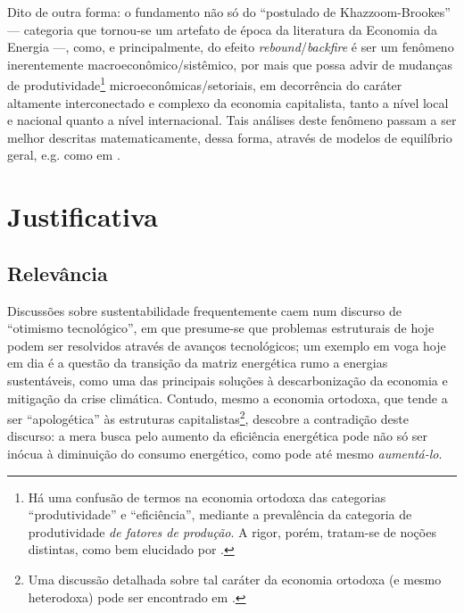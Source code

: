 Dito de outra forma: o fundamento não só do ``postulado de Khazzoom-Brookes'' --- categoria que tornou-se um artefato de época da literatura da Economia da Energia ---, como, e principalmente, do efeito \textit{rebound}/\textit{backfire} é ser um fenômeno inerentemente macroeconômico/sistêmico, por mais que possa advir de mudanças de produtividade\footnote{Há uma confusão de termos na economia ortodoxa das categorias ``produtividade'' e ``eficiência'', mediante a prevalência da categoria de produtividade \textit{de fatores de produção}. A rigor, porém, tratam-se de noções distintas, como bem elucidado por \textcite{SaBarreto2022}.} microeconômicas/setoriais, em decorrência do caráter altamente interconectado e complexo da economia capitalista, tanto a nível local e nacional quanto a nível internacional. Tais análises deste fenômeno passam a ser melhor descritas matematicamente, dessa forma, através de modelos de equilíbrio geral, e.g. como em \textcite{Hanley2009}. 


\chapter{Justificativa}
\label{cap:justificativa}

\section{Relevância}
Discussões sobre sustentabilidade frequentemente caem num discurso de ``otimismo tecnológico'', em que presume-se que problemas estruturais de hoje podem ser resolvidos através de avanços tecnológicos; um exemplo em voga hoje em dia é a questão da transição da matriz energética rumo a energias sustentáveis, como uma das principais soluções à descarbonização da economia e mitigação da crise climática. Contudo, mesmo a economia ortodoxa, que tende a ser ``apologética'' às estruturas capitalistas\footnote{Uma discussão detalhada sobre tal caráter da economia ortodoxa (e mesmo heterodoxa) pode ser encontrado em \textcite{Medeiros2013}.}, descobre a contradição deste discurso: a mera busca pelo aumento da eficiência energética pode não só ser inócua à diminuição do consumo energético, como pode até mesmo \textit{aumentá-lo}. 


